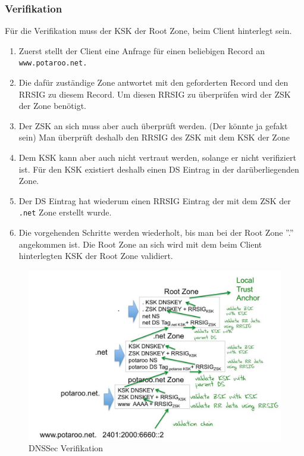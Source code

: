 \subsubsection{Verifikation}
Für die Verifikation muss der KSK der Root Zone, beim Client hinterlegt sein.
\begin{enumerate}
	\item Zuerst stellt der Client eine Anfrage für einen beliebigen Record an \lstinline|www.potaroo.net.|
	\item Die dafür zuständige Zone antwortet mit den geforderten Record und den RRSIG zu diesem Record. Um diesen RRSIG zu überprüfen wird der ZSK der Zone benötigt. 
	\item Der ZSK an sich muss aber auch überprüft werden. (Der könnte ja gefakt sein) Man überprüft deshalb den RRSIG des ZSK mit dem KSK der Zone
	\item Dem KSK kann aber auch nicht vertraut werden, solange er nicht verifiziert ist. Für den KSK existiert deshalb einen DS Eintrag in der darüberliegenden Zone. 
	\item Der DS Eintrag hat wiederum einen RRSIG Eintrag der mit dem ZSK der \lstinline|.net| Zone erstellt wurde.
	\item Die vorgehenden Schritte werden wiederholt, bis man bei der Root Zone ''.'' angekommen ist. Die Root Zone an sich wird mit dem beim Client hinterlegten KSK der Root Zone validiert.
\end{enumerate}


\begin{figure}[h]
	\centering
	\includegraphics[width=0.9\linewidth]{images/dnssec_verification}
	\caption{DNSSec Verifikation}
	\label{fig:dnssecverification}
\end{figure}


